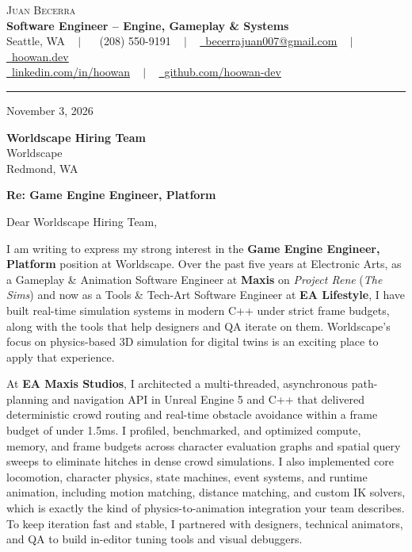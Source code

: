 \documentclass[letterpaper,11pt]{article}
\begin{document}
\begin{center}
    {\Huge \scshape Juan Becerra} \\ \vspace{4pt}
    \textbf{\large Software Engineer -- Engine, Gameplay \& Systems} \\ \vspace{4pt}
    \small Seattle, WA ~ $|$ ~
    \raisebox{-0.1\height}\faPhone\ (208) 550-9191 ~ $|$ ~
    \href{mailto:becerrajuan007@gmail.com}{\raisebox{-0.2\height}\faEnvelope\ \underline{becerrajuan007@gmail.com}} ~ $|$ ~
    \href{https://hoowan.dev}{\raisebox{-0.2\height}\faGlobe\ \underline{hoowan.dev}} \\ \vspace{2pt}
    \href{https://linkedin.com/in/hoowan/}{\raisebox{-0.2\height}\faLinkedin\ \underline{linkedin.com/in/hoowan}} ~ $|$ ~
    \href{https://github.com/hoowan-dev}{\raisebox{-0.2\height}\faGithub\ \underline{github.com/hoowan-dev}}
\end{center}

\vspace{4pt}
\hrule
\vspace{14pt}

\noindent November 3, 2026

\vspace{8pt}
\noindent \textbf{Worldscape Hiring Team} \\
Worldscape \\
Redmond, WA

\vspace{8pt}
\noindent \textbf{Re: Game Engine Engineer, Platform}

\vspace{8pt}
\noindent Dear Worldscape Hiring Team,

I am writing to express my strong interest in the \textbf{Game Engine Engineer, Platform} position at
Worldscape. Over the past five years at Electronic Arts, as a Gameplay \& Animation Software Engineer at
\textbf{Maxis} on \emph{Project Rene} (\emph{The Sims}) and now as a Tools \& Tech-Art Software Engineer at
\textbf{EA Lifestyle}, I have built real-time simulation systems in modern C++ under strict frame budgets,
along with the tools that help designers and QA iterate on them. Worldscape's focus on physics-based 3D
simulation for digital twins is an exciting place to apply that experience.

At \textbf{EA Maxis Studios}, I architected a multi-threaded, asynchronous path-planning and navigation API in
Unreal Engine 5 and C++ that delivered deterministic crowd routing and real-time obstacle avoidance within a
frame budget of under 1.5ms. I profiled, benchmarked, and optimized compute, memory, and frame budgets across
character evaluation graphs and spatial query sweeps to eliminate hitches in dense crowd simulations. I also
implemented core locomotion, character physics, state machines, event systems, and runtime animation,
including motion matching, distance matching, and custom IK solvers, which is exactly the kind of
physics-to-animation integration your team describes. To keep iteration fast and stable, I partnered with
designers, technical animators, and QA to build in-editor tuning tools and visual debuggers.
\end{document}
